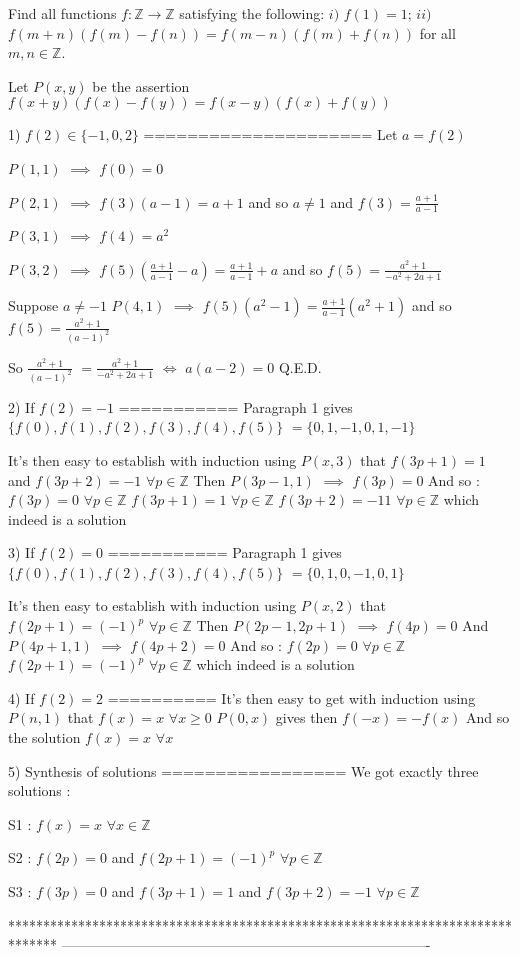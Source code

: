 \begin{solution}
	\begin{tcolorbox}Find all functions $f:\mathbb{Z}\rightarrow \mathbb{Z}$ satisfying the following:
$i)$ $f(1)=1$;
$ii)$ $f(m+n)(f(m)-f(n))=f(m-n)(f(m)+f(n))$ for all $m,n \in \mathbb{Z}$.\end{tcolorbox}
Let $P(x,y)$ be the assertion $f(x+y)(f(x)-f(y))=f(x-y)(f(x)+f(y))$

1) $f(2)\in\{-1,0,2\}$
=====================
Let $a=f(2)$

$P(1,1)$ $\implies$ $f(0)=0$

$P(2,1)$ $\implies$ $f(3)(a-1)=a+1$ and so $a\ne 1$ and $f(3)=\frac{a+1}{a-1}$

$P(3,1)$ $\implies$ $f(4)=a^2$

$P(3,2)$ $\implies$ $f(5)(\frac{a+1}{a-1}-a)=\frac{a+1}{a-1}+a$ and so $f(5)=\frac{a^2+1}{-a^2+2a+1}$

Suppose $a\ne -1$
$P(4,1)$  $\implies$ $f(5)(a^2-1)=\frac{a+1}{a-1}(a^2+1)$ and so $f(5)=\frac{a^2+1}{(a-1)^2}$

So $\frac{a^2+1}{(a-1)^2}$ $=\frac{a^2+1}{-a^2+2a+1}$ $\iff$ $a(a-2)=0$
Q.E.D.

2) If $f(2)=-1$
===========
Paragraph 1 gives $\{f(0),f(1),f(2),f(3),f(4),f(5)\}$ $=\{0,1,-1,0,1,-1\}$

It's then easy to establish with induction using $P(x,3)$ that $f(3p+1)=1$ and $f(3p+2)=-1$ $\forall p\in\mathbb Z$
Then $P(3p-1,1)$ $\implies$ $f(3p)=0$
And so :
$f(3p)=0$ $\forall p\in\mathbb Z$
$f(3p+1)=1$ $\forall p\in\mathbb Z$
$f(3p+2)=-11$ $\forall p\in\mathbb Z$
which indeed is a solution

3) If $f(2)=0$
===========
Paragraph 1 gives $\{f(0),f(1),f(2),f(3),f(4),f(5)\}$ $=\{0,1,0,-1,0,1\}$

It's then easy to establish with induction using $P(x,2)$ that $f(2p+1)=(-1)^p$ $\forall p\in\mathbb Z$
Then $P(2p-1,2p+1)$ $\implies$ $f(4p)=0$
And $P(4p+1,1)$ $\implies$ $f(4p+2)=0$
And so :
$f(2p)=0$ $\forall p\in\mathbb Z$
$f(2p+1)=(-1)^p$ $\forall p\in\mathbb Z$
which indeed is a solution

4) If $f(2)=2$
==========
It's then easy to get with induction using $P(n,1)$ that $f(x)=x$ $\forall x\ge 0$
$P(0,x)$ gives then $f(-x)=-f(x)$
And so the solution $f(x)=x$ $\forall x$

5) Synthesis of solutions 
=================
We got exactly three solutions :

S1 : $f(x)=x$ $\forall x\in\mathbb Z$

S2 : $f(2p)=0$ and $f(2p+1)=(-1)^p$ $\forall p\in\mathbb Z$

S3 : $f(3p)=0$ and $f(3p+1)=1$ and $f(3p+2)=-1$ $\forall p\in\mathbb Z$
\end{solution}
*******************************************************************************
-------------------------------------------------------------------------------

